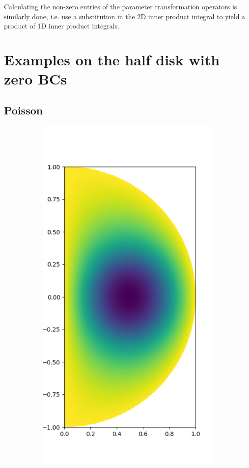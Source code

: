 \documentclass[11pt, oneside]{article}   	%
\begin{document}
Calculating the non-zero entries of the parameter transformation operators is similarly done, i.e. use a substitution in the 2D inner product integral to yield a product of 1D inner product integrals. 


%
\section{Examples on the half disk with zero BCs}\label{Section:Examples}


\subsection{Poisson}

\begin{figure}
	\begin{subfigure}[t]{0.3\textwidth}
	\centering
	\includegraphics[scale=0.3]{solution-poisson}

\end{subfigure}
\end{figure}
\end{document}
